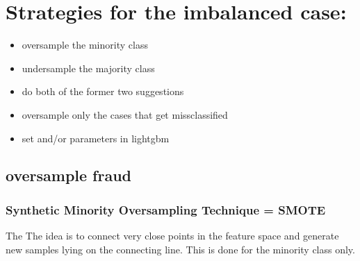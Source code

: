 \documentclass[letterpaper,10pt,english]{jupyterBook}
\begin{document}
\begin{sphinxVerbatim}[commandchars=\\\{\}]
                 
         
\end{sphinxVerbatim}


\chapter{Strategies for the imbalanced case:}
\label{\detokenize{imbalanced_data:strategies-for-the-imbalanced-case}}\begin{itemize}
\item {} 
\sphinxAtStartPar
oversample the minority class

\item {} 
\sphinxAtStartPar
undersample the majority class

\item {} 
\sphinxAtStartPar
do both of the former two suggestions

\item {} 
\sphinxAtStartPar
oversample only the cases that get missclassified

\item {} 
\sphinxAtStartPar
set  and/or  parameters in lightgbm

\end{itemize}


\section{oversample fraud}
\label{\detokenize{imbalanced_data:oversample-fraud}}

\subsection{Synthetic Minority Oversampling Technique = SMOTE}
\label{\detokenize{imbalanced_data:synthetic-minority-oversampling-technique-smote}}
\sphinxAtStartPar
The 
The idea is to connect very close points in the feature space and generate new samples lying on the connecting line. This is done for the minority class only.
\end{document}
